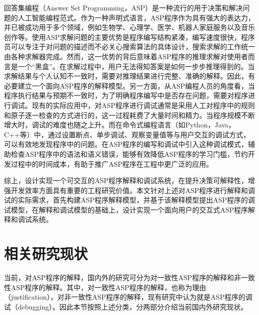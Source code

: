 回答集编程（Answer Set Programming，ASP）是一种流行的用于决策和解决问题的人工智能编程范式。作为一种声明式语言，ASP程序作为具有强大的表达力，并已被成功用于多个领域\cite{erdem2016applications}，例如生物学\cite{erdem2015generating}、心理学\cite{psychology2010Balduccini}、医学\cite{bao2011medical, zhang2014preliminary}、机器人家庭服务\cite{jjm2010robertasp}以及音乐创作\cite{boennAutomaticMusicComposition2011}等。使用ASP求解问题的主要优势是程序编写结构紧凑，编写速度很快，程序员可以专注于对问题的描述而不必关心搜索算法的具体设计，搜索求解的工作统一由各种求解器完成\cite{brain2008answer}。然而，这一优势的背后意味着ASP程序的推理求解对使用者而言是一个“黑盒”\cite{huaqi2018lp}。在求解过程中，用户无法得知答案是如何一步步推理得到的。当求解结果与个人认知不一致时，需要对推理结果进行完整、准确的解释。因此，有必要建立一个面向ASP程序的解释模型。另一方面，从ASP编程人员的角度看，当程序执行结果与预期不一致时，为了明确程序编写中是否存在问题，需要对程序进行调试。现有的实际应用中，对ASP程序进行调试通常是采用人工对程序中的规则和原子逐一检查的方式进行的，这一过程耗费了大量时间和精力\cite{dodaroInteractiveDebuggingNonground2015}。当程序规模不断增大时，调试的难度也随之上升。而在命令式编程语言（如Python，Java，C++等）中，通过设置断点、单步调试、观察变量值等与用户交互的调试方式，可以有效地发现程序中的问题\cite{stumptner1998survey}。在ASP程序的编写和调试中引入这种调试模式，辅助检查ASP程序中的语法和语义错误，能够有效降低ASP程序的学习门槛，节约开发过程中的时间成本，有助于推广ASP程序在工程中更广泛的应用。

综上，设计实现一个可交互的ASP程序解释和调试系统，在提升决策可解释性，增强开发效率方面具有重要的工程研究价值。本文针对上述对ASP程序进行解释和调试的实际需求，首先构建ASP程序解释模型，并基于该解释模型提出ASP程序的调试模型，在解释和调试模型的基础上，设计实现一个面向用户的交互式ASP程序解释和调试系统。
\section{相关研究现状}
当前，对ASP程序的解释，国内外的研究可分为对一致性ASP程序的解释和非一致性ASP程序的解释。其中，对一致性ASP程序的解释，也称为理由（justification），对非一致性ASP程序的解释，现有研究中认为就是ASP程序的调试（debugging）\cite{fandAnsWhy2019}。因此本节按照上述分类，分两部分介绍当前国内外研究现状。

